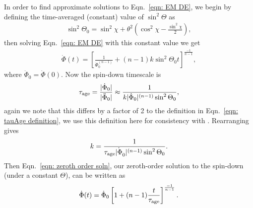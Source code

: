 \documentclass[../full_thesis/full_thesis.tex]{subfiles}
\begin{document}
In order to find approximate solutions to Eqn.~\eqref{eqn: EM DE}, we begin by
defining the time-averaged (constant) value of $\sin^{2}\Theta$ as
\begin{align}
\sin^{2}\Theta_0 =
\sin^{2}\chi + \theta^{2}\left(\cos^{2}\chi - \frac{\sin^{2}\chi}{2}\right),
\label{eqn: sin2Theta0}
\end{align}
then solving Eqn.~\eqref{eqn: EM DE} with this constant value we get
\begin{align}
\dot{\Phi}(t) = \left[\frac{1}{\dot{\Phi}_0^{(n-1)}}
+ (n-1)k\sin^{2}\Theta_0 t \right]^{\frac{-1}{n-1}},
\label{eqn: zeroth order soln}
\end{align}
where $\dot{\Phi}_0 = \dot{\Phi}(0)$. Now the spin-down timescale is
\begin{align}
\tau_{\mathrm{age}} = \frac{|\dot{\Phi}_0|}{|\ddot{\Phi}_0|}
\approx \frac{1}{k|\dot{\Phi}_0|^{(n-1)} \sin^{2}\Theta_0},
\end{align}
again we note that this differs by a factor of 2 to the definition in
Eqn.~\eqref{eqn: tauAge definition}, we use this definition here for
consistency with \citet{Jones2001}. Rearranging gives
\begin{align}
k = \frac{1}{\tau_{\mathrm{age}} \dot{|\Phi}_0|^{(n-1)} \sin^{2}\Theta_0}.
\end{align}
Then Eqn.~\eqref{eqn: zeroth order soln}, our zeroth-order solution to the
spin-down (under a constant $\Theta$), can be written as
\begin{align}
\dot{\Phi}(t) = \dot{\Phi}_0\left[1 + (n-1)\frac{t}{\tau_{\mathrm{age}}}\right]^{\frac{-1}{n-1}}.
\label{eqn: zeroth order soln complete}
\end{align}
\end{document}
